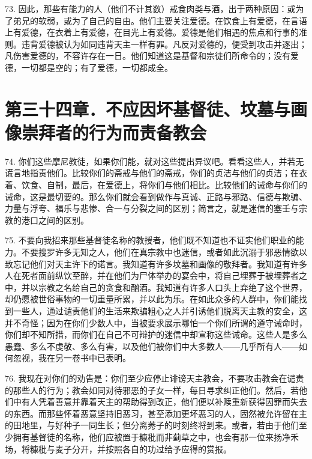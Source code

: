 73. 因此，那些有能力的人（他们不计其数）戒食肉类与酒，出于两种原因：或为了弟兄的软弱，或为了自己的自由。他们主要关注爱德。在饮食上有爱德，在言语上有爱德，在衣着上有爱德，在目光上有爱德。爱德是他们相遇的焦点和行事的准则。违背爱德被认为如同违背天主一样有罪。凡反对爱德的，便受到攻击并逐出；凡伤害爱德的，不容许存在一日。他们知道这是基督和宗徒们所命令的；没有爱德，一切都是空的；有了爱德，一切都成全。\par


\section{第三十四章．不应因坏基督徒、坟墓与画像崇拜者的行为而责备教会}

74. 你们这些摩尼教徒，如果你们能，就对这些提出异议吧。看看这些人，并若无谎言地指责他们。比较你们的斋戒与他们的斋戒，你们的贞洁与他们的贞洁；在衣着、饮食、自制，最后，在爱德上，将你们与他们相比。比较他们的诫命与你们的诫命，这是最切要的。那么你们就会看到做作与真诚、正路与邪路、信德与欺骗、力量与浮夸、福乐与悲惨、合一与分裂之间的区别；简言之，就是迷信的塞壬与宗教的港口之间的区别。\par

75. 不要向我招来那些基督徒名称的教授者，他们既不知道也不证实他们职业的能力。不要搜罗许多无知之人，他们在真宗教中也迷信，或者如此沉溺于邪恶情欲以致忘记他们对天主许下的诺言。我知道有许多坟墓和画像的敬拜者。我知道有许多人在死者面前纵饮至醉，并在他们为尸体举办的宴会中，将自己埋葬于被埋葬者之中，并以宗教之名给自己的贪食和酗酒。我知道有许多人口头上弃绝了这个世界，却仍愿被世俗事物的一切重量所累，并以此为乐。在如此众多的人群中，你们能找到一些人，通过谴责他们的生活来欺骗粗心之人并引诱他们脱离天主教的安全，这并不奇怪；因为在你们少数人中，当被要求展示哪怕一个你们所谓的遵守诫命时，你们却不知所措，而你们在自己不可辩护的迷信中却宣称这些诫命。这些人是多么愚蠢、多么不虔敬、多么有害，以及他们被你们中大多数人——几乎所有人——如何忽视，我在另一卷书中已表明。\par

76. 我现在对你们的劝告是：你们至少应停止诽谤天主教会，不要攻击教会在谴责的那些人的行为；教会如同对待邪恶的子女一样，每日寻求纠正他们。然后，若他们中有人凭着善意并靠着天主的帮助得到改正，他们便以补赎重新获得因罪而失去的东西。而那些怀着恶意坚持旧恶习，甚至添加更坏恶习的人，固然被允许留在主的田地里，与好种子一同生长；但分离莠子的时刻终将到来。或者，若由于他们至少拥有基督徒的名称，他们应被置于糠秕而非蓟草之中，也会有那一位来扬净禾场，将糠秕与麦子分开，并按照各自的功过给予应得的赏报。\par

